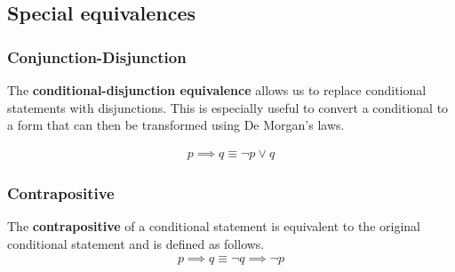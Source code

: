 \subsection{Special equivalences}
\subsubsection{Conjunction-Disjunction} The \textbf{conditional-disjunction equivalence} allows us to replace conditional statements with disjunctions. This is especially useful to convert a conditional to a form that can then be transformed using De Morgan's laws.

\begin{gather*}
p \implies q \equiv \neg p \vee q
\end{gather*}

\subsubsection{Contrapositive}The \textbf{contrapositive} of a conditional statement is equivalent to the original conditional statement and is defined as follows.
\begin{gather*}
p \implies q \equiv \neg q \implies \neg p
\end{gather*}

